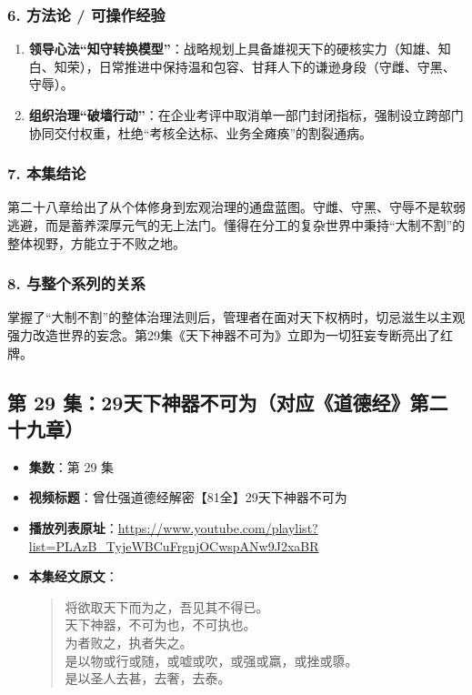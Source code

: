 \subsubsection{6. 方法论 / 可操作经验}
\begin{enumerate}
    \item \textbf{领导心法“知守转换模型”}：战略规划上具备雄视天下的硬核实力（知雄、知白、知荣），日常推进中保持温和包容、甘拜人下的谦逊身段（守雌、守黑、守辱）。
    \item \textbf{组织治理“破墙行动”}：在企业考评中取消单一部门封闭指标，强制设立跨部门协同交付权重，杜绝“考核全达标、业务全瘫痪”的割裂通病。
\end{enumerate}

\subsubsection{7. 本集结论}
第二十八章给出了从个体修身到宏观治理的通盘蓝图。守雌、守黑、守辱不是软弱逃避，而是蓄养深厚元气的无上法门。懂得在分工的复杂世界中秉持“大制不割”的整体视野，方能立于不败之地。

\subsubsection{8. 与整个系列的关系}
掌握了“大制不割”的整体治理法则后，管理者在面对天下权柄时，切忌滋生以主观强力改造世界的妄念。第29集《天下神器不可为》立即为一切狂妄专断亮出了红牌。

\clearpage

\subsection{第 29 集：29天下神器不可为（对应《道德经》第二十九章）}
\label{sec:ep29}

\begin{itemize}
    \item \textbf{集数}：第 29 集
    \item \textbf{视频标题}：曾仕强道德经解密【81全】29天下神器不可为
    \item \textbf{播放列表原址}：\url{https://www.youtube.com/playlist?list=PLAzB_TyjeWBCuFrgnjOCwspANw9J2xaBR}
    \item \textbf{本集经文原文}：
    \begin{quote}\kaishu
    将欲取天下而为之，吾见其不得已。\\
    天下神器，不可为也，不可执也。\\
    为者败之，执者失之。\\
    是以物或行或随，或嘘或吹，或强或羸，或挫或隳。\\
    是以圣人去甚，去奢，去泰。
    \end{quote}
\end{itemize}


